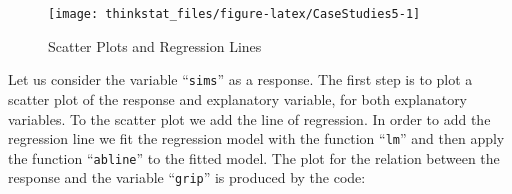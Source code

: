 \documentclass[]{krantz}
\makeatletter
\newenvironment{Shaded}{\begin{snugshade}}{\end{snugshade}}
\newcommand{\KeywordTok}[1]{\textcolor[rgb]{0.13,0.29,0.53}{\textbf{#1}}}
\newcommand{\DataTypeTok}[1]{\textcolor[rgb]{0.13,0.29,0.53}{#1}}
\newcommand{\DecValTok}[1]{\textcolor[rgb]{0.00,0.00,0.81}{#1}}
\newcommand{\FloatTok}[1]{\textcolor[rgb]{0.00,0.00,0.81}{#1}}
\newcommand{\StringTok}[1]{\textcolor[rgb]{0.31,0.60,0.02}{#1}}
\newcommand{\CommentTok}[1]{\textcolor[rgb]{0.56,0.35,0.01}{\textit{#1}}}
\newcommand{\OperatorTok}[1]{\textcolor[rgb]{0.81,0.36,0.00}{\textbf{#1}}}
\newcommand{\NormalTok}[1]{#1}
\newenvironment{kframe}{%
\medskip{}
\setlength{\fboxsep}{.8em}
 \def\at@end@of@kframe{}%
 \ifinner\ifhmode%
  \def\at@end@of@kframe{\end{minipage}}%
  \begin{minipage}{\columnwidth}%
 \fi\fi%
 \def\FrameCommand##1{\hskip\@totalleftmargin \hskip-\fboxsep
 \colorbox{shadecolor}{##1}\hskip-\fboxsep
     \hskip-\linewidth \hskip-\@totalleftmargin \hskip\columnwidth}%
 \MakeFramed {\advance\hsize-\width
   \@totalleftmargin\z@ \linewidth\hsize
   \@setminipage}}%
 {\par\unskip\endMakeFramed%
 \at@end@of@kframe}
\renewenvironment{Shaded}{\begin{kframe}}{\end{kframe}}
\theoremstyle{definition}
\theoremstyle{definition}
\theoremstyle{definition}
\theoremstyle{remark}
\makeatother
\begin{document}
\begin{Shaded}
\end{Shaded}

\begin{figure}

{\centering \texttt{[image: thinkstat\_files/figure-latex/CaseStudies5-1]} 

}

\caption{Scatter Plots and Regression Lines}\label{fig:CaseStudies5}
\end{figure}

Let us consider the variable ``\texttt{sims}'' as a response. The first
step is to plot a scatter plot of the response and explanatory variable,
for both explanatory variables. To the scatter plot we add the line of
regression. In order to add the regression line we fit the regression
model with the function ``\texttt{lm}'' and then apply the function
``\texttt{abline}'' to the fitted model. The plot for the relation
between the response and the variable ``\texttt{grip}'' is produced by
the code:
\end{document}
